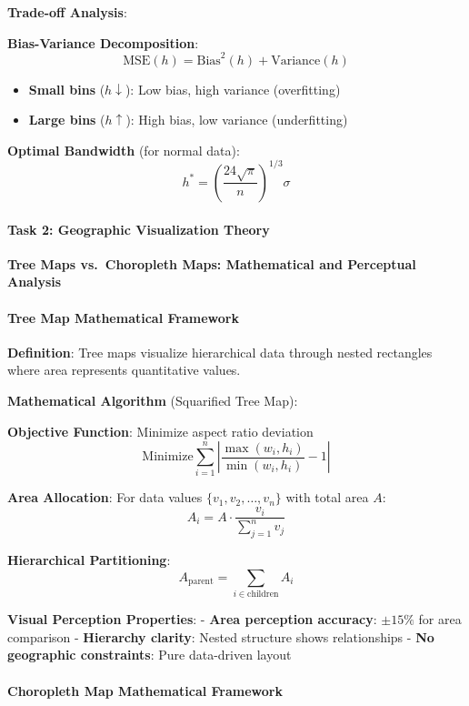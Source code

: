 \documentclass[11pt]{article}
\providecommand{\tightlist}{%
      \setlength{\itemsep}{0pt}\setlength{\parskip}{0pt}}
\begin{document}
\textbf{Trade-off Analysis}:

\textbf{Bias-Variance Decomposition}:
\[\text{MSE}(h) = \text{Bias}^2(h) + \text{Variance}(h)\]

\begin{itemize}
\tightlist
\item
  \textbf{Small bins} (\(h \downarrow\)): Low bias, high variance
  (overfitting)
\item
  \textbf{Large bins} (\(h \uparrow\)): High bias, low variance
  (underfitting)
\end{itemize}

\textbf{Optimal Bandwidth} (for normal data):
\[h^* = \left(\frac{24\sqrt{\pi}}{n}\right)^{1/3} \sigma\]

\paragraph{Task 2: Geographic Visualization
Theory}\label{task-2-geographic-visualization-theory}

\textbf{Tree Maps vs.~Choropleth Maps: Mathematical and Perceptual
Analysis}

\paragraph{Tree Map Mathematical
Framework}\label{tree-map-mathematical-framework}

\textbf{Definition}: Tree maps visualize hierarchical data through
nested rectangles where area represents quantitative values.

\textbf{Mathematical Algorithm} (Squarified Tree Map):

\textbf{Objective Function}: Minimize aspect ratio deviation
\[\text{Minimize} \sum_{i=1}^{n} \left|\frac{\max(w_i, h_i)}{\min(w_i, h_i)} - 1\right|\]

\textbf{Area Allocation}: For data values \(\{v_1, v_2, \ldots, v_n\}\)
with total area \(A\): \[A_i = A \cdot \frac{v_i}{\sum_{j=1}^{n} v_j}\]

\textbf{Hierarchical Partitioning}:
\[A_{\text{parent}} = \sum_{i \in \text{children}} A_i\]

\textbf{Visual Perception Properties}: - \textbf{Area perception
accuracy}: \(\pm 15\%\) for area comparison - \textbf{Hierarchy
clarity}: Nested structure shows relationships - \textbf{No geographic
constraints}: Pure data-driven layout

\paragraph{Choropleth Map Mathematical
Framework}\label{choropleth-map-mathematical-framework}
\end{document}

